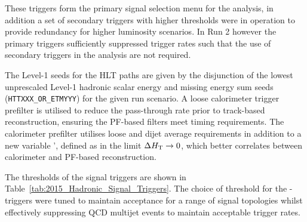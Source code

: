 These triggers form the primary signal selection menu for the analysis, in addition a set of secondary triggers with 
higher thresholds were in operation to provide redundancy for higher luminosity scenarios. In Run 2 however the primary 
triggers sufficiently suppressed trigger rates such that the use of secondary triggers in the analysis are not required.


The Level-1 seeds for the HLT paths are given by the disjunction of the lowest 
unprescaled Level-1 hadronic scalar energy and missing energy sum seeds (\verb!HTTXXX_OR_ETMYYY!) for 
the given run scenario. A loose calorimeter trigger prefilter is utilised to reduce the pass-through 
rate prior to track-based reconstruction, ensuring the PF-based filters meet timing requirements. The calorimeter prefilter 
utilises loose \scalht and dijet average \pt requirements in addition to a new variable \alphat', 
defined as \alphat in the limit $\Delta\mbox{$H_\text{T}$} \rightarrow 0$, which better correlates \alphat 
between calorimeter and PF-based reconstruction.

The thresholds of the signal triggers are shown in Table~\ref{tab:2015_Hadronic_Signal_Triggers}. The choice of threshold for 
the \scalht-\alphat triggers were tuned to maintain acceptance for a range of signal topologies whilst effectively suppressing QCD 
multijet events to maintain acceptable trigger rates. 




